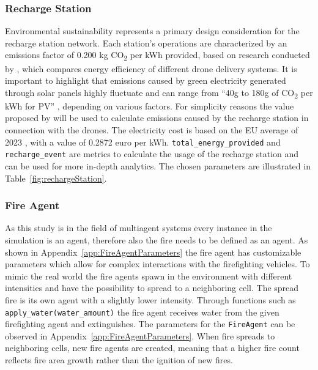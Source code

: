 \documentclass[twoside]{article}
\begin{document}
\subsubsection{Recharge Station}
\label{sec:RechargeStation}
Environmental sustainability represents a primary design consideration for the recharge station network. Each station's operations are characterized by an emissions factor of 0.200 kg CO\textsubscript{2} per kWh provided, based on research conducted by \citet*{stolaroffEnergyUseLife2018}, which compares energy efficiency of different drone delivery systems. It is important to highlight that emissions caused by green electricity generated through solar panels highly fluctuate and can range from ``40g to 180g of CO\textsubscript{2} per kWh for PV'' \citep{GreenhousegasEmissionsSolar2007}, depending on various factors. For simplicity reasons the value proposed by  \citet*{stolaroffEnergyUseLife2018} will be used to calculate emissions caused by the recharge station in connection with the drones. The electricity cost is based on the EU average of 2023 \citep{ElectricityPriceStatistics}, with a value of 0.2872 euro per kWh. \texttt{total\_energy\_provided} and \texttt{recharge\_event} are metrics to calculate the usage of the recharge station and can be used for more in-depth analytics. The chosen parameters are illustrated in Table~\ref{fig:rechargeStation}.

\subsubsection{Fire Agent}
\label{sec:FireAgent}

As this study is in the field of multiagent systems every instance in the simulation is an agent, therefore also the fire needs to be defined as an agent. As shown in Appendix~\ref{app:FireAgentParameters} the fire agent has customizable parameters which allow for complex interactions with the firefighting vehicles. To mimic the real world the fire agents spawn in the environment with different intensities and have the possibility to spread to a neighboring cell. The spread fire is its own agent with a slightly lower intensity. Through functions such as \texttt{apply\_water(water\_amount)} the fire agent receives water from the given firefighting agent and extinguishes. The parameters for the \texttt{FireAgent} can be observed in Appendix~\ref{app:FireAgentParameters}. When fire spreads to neighboring cells, new fire agents are created, meaning that a higher fire count reflects fire area growth rather than the ignition of new fires.
\end{document}
